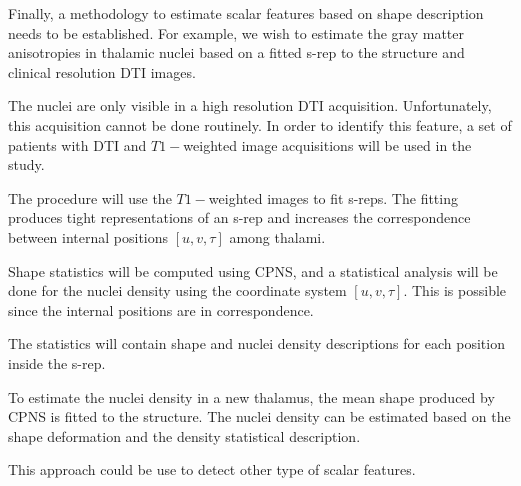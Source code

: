 Finally, 
a methodology to estimate scalar features based on shape description needs to 
be established. 
For example, we wish to estimate the gray matter anisotropies
in thalamic nuclei based on a fitted s-rep to the structure
and clinical resolution DTI images. 

The nuclei are only visible in a high resolution DTI acquisition. 
Unfortunately, this acquisition cannot be done routinely.
In order to identify this feature, 
a set of patients with DTI and $T1-$weighted image
acquisitions will be used in the study. 

The procedure will use the $T1-$weighted images to fit s-reps.
The fitting produces tight representations of an s-rep
and increases the correspondence between internal positions $[u, v, \tau]$ among thalami.

Shape statistics will be computed using CPNS, 
and a statistical analysis will be done for 
the nuclei density using the coordinate system $[u, v, \tau]$. 
This is possible since the internal positions are in correspondence.

The statistics will contain shape and nuclei density 
descriptions for each position inside the s-rep. 

To estimate the nuclei density in a new thalamus, 
the mean shape produced by CPNS is fitted to the structure.
The nuclei density can be estimated based on 
the shape deformation and the density statistical description. 

This approach could be use to detect other type of scalar features. 
